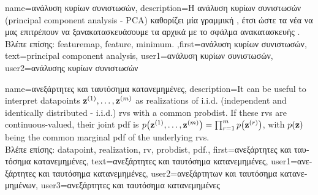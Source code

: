 {name={\foreignlanguage{greek}{ανάλυση κυρίων συνιστωσών}}, 
	description={\foreignlanguage{greek}{Η ανάλυση κυρίων συνιστωσών} (principal component analysis - PCA)
		\foreignlanguage{greek}{καθορίζει μία γραμμική} , \foreignlanguage{greek}{έτσι ώστε τα νέα}  
		\foreignlanguage{greek}{να μας επιτρέπουν να ξανακατασκευάσουμε τα αρχικά}  \foreignlanguage{greek}{με το}  
		\foreignlanguage{greek}{σφάλμα ανακατασκευής} \cite{MLBasics}.\\
		\foreignlanguage{greek}{Βλέπε επίσης:} \gls{featuremap}, \gls{feature}, \gls{minimum}.
		},first={\foreignlanguage{greek}{ανάλυση κυρίων συνιστωσών}},
		text={principal component analysis},
		user1={\foreignlanguage{greek}{ανάλυση κυρίων συνιστωσών}}, %
		user2={\foreignlanguage{greek}{ανάλυσης κυρίων συνιστωσών}} %
}

{name={\foreignlanguage{greek}{ανεξάρτητες και ταυτόσημα κατανεμημένες}}, 
	description={It can be useful to 
		interpret \gls{datapoint}s ${\bf z}^{(1)},\ldots,{\bf z}^{(m)}$ 
		as \gls{realization}s of i.i.d. (independent and identically distributed - i.i.d.) \gls{rv}s with 
		a common \gls{probdist}. If these \gls{rv}s are continuous-valued, their joint \gls{pdf} is 
		$p\big({\bf z}^{(1)},\ldots,{\bf z}^{(m)} \big) = \prod_{r=1}^{m} p \big({\bf z}^{(r)}\big)$, 
		with $p({\bf z})$ being the common 
		marginal \gls{pdf} of the underlying \gls{rv}s.\\
		\foreignlanguage{greek}{Βλέπε επίσης:} \gls{datapoint}, \gls{realization}, \gls{rv}, \gls{probdist}, \gls{pdf}.},
	first={\foreignlanguage{greek}{ανεξάρτητες και ταυτόσημα κατανεμημένες}},
	text={\foreignlanguage{greek}{ανεξάρτητες και ταυτόσημα κατανεμημένες}},
	user1={\foreignlanguage{greek}{ανεξάρτητες και ταυτόσημα κατανεμημένες}}, %
  	user2={\foreignlanguage{greek}{ανεξάρτητων και ταυτόσημα κατανεμημένων}}, %
	user3={\foreignlanguage{greek}{ανεξάρτητες και ταυτόσημα κατανεμημένες}} %
}


